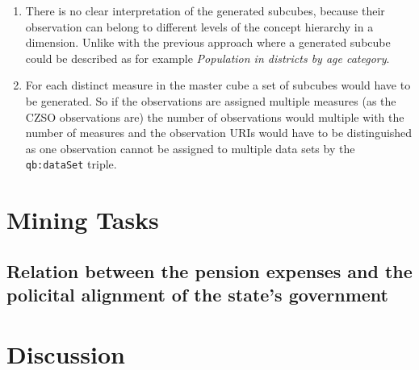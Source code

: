 \begin{enumerate}
    \item There is no clear interpretation of the generated subcubes, because their observation can belong to different levels of the concept hierarchy in a dimension. Unlike with the previous approach where a generated subcube could be described as for example \textit{Population in districts by age category}.
    \item For each distinct measure in the master cube a set of subcubes would have to be generated. So if the observations are assigned multiple measures (as the CZSO observations are) the number of observations would multiple with the number of measures and the observation URIs would have to be distinguished as one observation cannot be assigned to multiple data sets by the \verb|qb:dataSet| triple.
\end{enumerate}


\section{Mining Tasks}



\subsection{Relation between the pension expenses and the policital alignment of the state's government}


\section{Discussion}